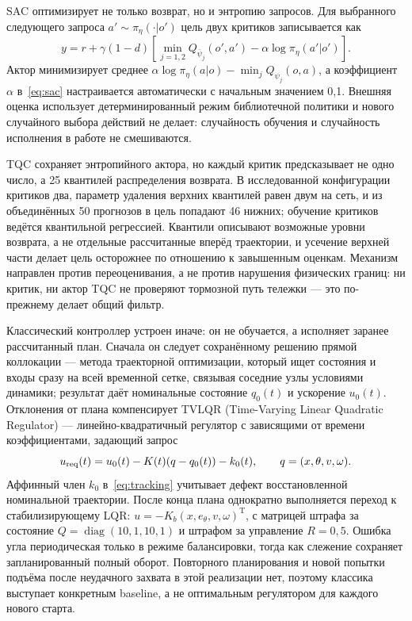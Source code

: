 SAC оптимизирует не только возврат, но и энтропию запросов. Для выбранного следующего запроса $a'\sim\pi_\eta(\cdot|o')$ цель двух критиков записывается как
\begin{equation}
y=r+\gamma(1-d)\left[\min_{j=1,2}Q_{\bar\psi_j}(o',a')-\alpha\log\pi_\eta(a'|o')\right].
\label{eq:sac}
\end{equation}
Актор минимизирует среднее $\alpha\log\pi_\eta(a|o)-\min_jQ_{\psi_j}(o,a)$, а коэффициент $\alpha$ в~\eqref{eq:sac} настраивается автоматически с начальным значением 0,1. Внешняя оценка использует детерминированный режим библиотечной политики и нового случайного выбора действий не делает: случайность обучения и случайность исполнения в работе не смешиваются.

TQC сохраняет энтропийного актора, но каждый критик предсказывает не одно число, а 25 квантилей распределения возврата. В исследованной конфигурации критиков два, параметр удаления верхних квантилей равен двум на сеть, и из объединённых 50 прогнозов в цель попадают 46 нижних; обучение критиков ведётся квантильной регрессией. Квантили описывают возможные уровни возврата, а не отдельные рассчитанные вперёд траектории, и усечение верхней части делает цель осторожнее по отношению к завышенным оценкам. Механизм направлен против переоценивания, а не против нарушения физических границ: ни критик, ни актор TQC не проверяют тормозной путь тележки — это по-прежнему делает общий фильтр.

Классический контроллер устроен иначе: он не обучается, а исполняет заранее рассчитанный план. Сначала он следует сохранённому решению прямой коллокации — метода траекторной оптимизации, который ищет состояния и входы сразу на всей временной сетке, связывая соседние узлы условиями динамики; результат даёт номинальные состояние $q_0(t)$ и ускорение $u_0(t)$. Отклонения от плана компенсирует TVLQR (Time-Varying Linear Quadratic Regulator) — линейно-квадратичный регулятор с зависящими от времени коэффициентами, задающий запрос
\begin{equation}
u_{\rm req}(t)=u_0(t)-K(t)(q-q_0(t))-k_0(t),\qquad q=(x,\theta,v,\omega).
\label{eq:tracking}
\end{equation}
Аффинный член $k_0$ в~\eqref{eq:tracking} учитывает дефект восстановленной номинальной траектории. После конца плана однократно выполняется переход к стабилизирующему LQR: $u=-K_b(x,e_\theta,v,\omega)^\mathrm{T}$, с матрицей штрафа за состояние $Q=\operatorname{diag}(10,1,10,1)$ и штрафом за управление $R=0{,}5$. Ошибка угла периодическая только в режиме балансировки, тогда как слежение сохраняет запланированный полный оборот. Повторного планирования и новой попытки подъёма после неудачного захвата в этой реализации нет, поэтому классика выступает конкретным baseline, а не оптимальным регулятором для каждого нового старта.

